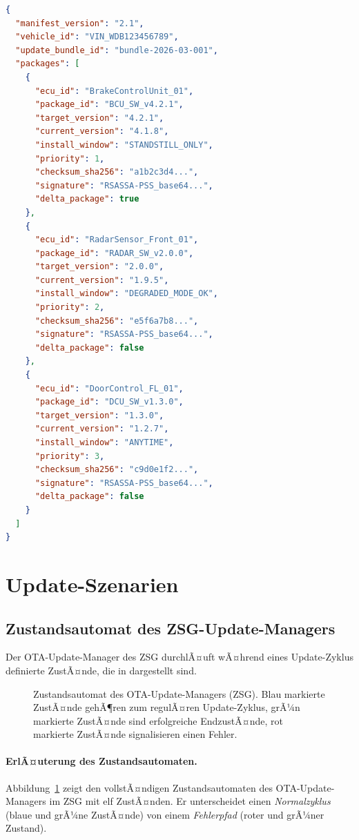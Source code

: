 ﻿\documentclass[12pt,a4paper,twoside]{article}
\begin{document}
\begin{lstlisting}[language=json,caption={Software Update Manifest (SUM) -- vereinfachtes Beispiel},label={lst:manifest}]
{
  "manifest_version": "2.1",
  "vehicle_id": "VIN_WDB123456789",
  "update_bundle_id": "bundle-2026-03-001",
  "packages": [
    {
      "ecu_id": "BrakeControlUnit_01",
      "package_id": "BCU_SW_v4.2.1",
      "target_version": "4.2.1",
      "current_version": "4.1.8",
      "install_window": "STANDSTILL_ONLY",
      "priority": 1,
      "checksum_sha256": "a1b2c3d4...",
      "signature": "RSASSA-PSS_base64...",
      "delta_package": true
    },
    {
      "ecu_id": "RadarSensor_Front_01",
      "package_id": "RADAR_SW_v2.0.0",
      "target_version": "2.0.0",
      "current_version": "1.9.5",
      "install_window": "DEGRADED_MODE_OK",
      "priority": 2,
      "checksum_sha256": "e5f6a7b8...",
      "signature": "RSASSA-PSS_base64...",
      "delta_package": false
    },
    {
      "ecu_id": "DoorControl_FL_01",
      "package_id": "DCU_SW_v1.3.0",
      "target_version": "1.3.0",
      "current_version": "1.2.7",
      "install_window": "ANYTIME",
      "priority": 3,
      "checksum_sha256": "c9d0e1f2...",
      "signature": "RSASSA-PSS_base64...",
      "delta_package": false
    }
  ]
}
\end{lstlisting}


\section{Update-Szenarien}
\label{sec:szenario}


\subsection{Zustandsautomat des ZSG-Update-Managers}
\label{subsec:zustandsautomat}

Der OTA-Update-Manager des ZSG durchlÃ¤uft wÃ¤hrend eines Update-Zyklus
definierte ZustÃ¤nde, die in  dargestellt sind.

\begin{figure}[h!]
  \centering
  
  \caption{Zustandsautomat des OTA-Update-Managers (ZSG).
    Blau markierte ZustÃ¤nde gehÃ¶ren zum regulÃ¤ren Update-Zyklus,
    grÃ¼n markierte ZustÃ¤nde sind erfolgreiche EndzustÃ¤nde,
    rot markierte ZustÃ¤nde signalisieren einen Fehler.}
  \label{fig:statemachine}
\end{figure}

\paragraph*{ErlÃ¤uterung des Zustandsautomaten.}
Abbildung~\ref{fig:statemachine} zeigt den vollstÃ¤ndigen Zustandsautomaten
des OTA-Update-Managers im ZSG mit elf ZustÃ¤nden.
Er unterscheidet einen \emph{Normalzyklus} (blaue und grÃ¼ne ZustÃ¤nde) von
einem \emph{Fehlerpfad} (roter und grÃ¼ner Zustand).
\end{document}
